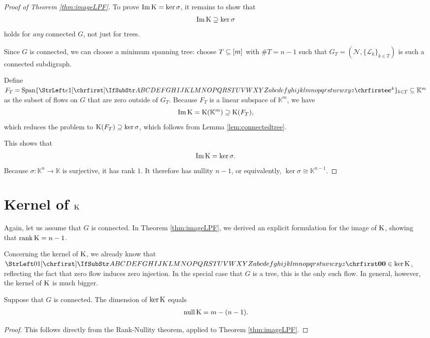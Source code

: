 \documentclass[main.tex]{subfiles}
\begin{document}
\begin{proof}[Proof of Theorem \ref{thm:imageLPF}]
To prove $\operatorname{Im} \text{\textup{K}} = \ker \sigma$, it remains to show that
\begin{gather}
\operatorname{Im} \text{\textup{K}} \supseteq \ker \sigma
\end{gather}
holds for \emph{any} connected $G$, not just for trees.

Since $G$ is connected, we can choose a minimum spanning tree: choose $T \subseteq [m]$ with $\# T = n-1$ such that $G_T=(\mathcal{N}, \{\mathcal{L}_k\}_{k \in T})$ is such a connected subdigraph.

Define $F_T = \linspan \{\mat{e}^k\}_{k \in T} \subseteq \mathbb{K}^m$ as the subset of flows on $G$ that are zero outside of $G_T$. Because $F_T$ is a linear subspace of $\mathbb{K}^m$, we have
$$\operatorname{Im} \text{\textup{K}} = \text{\textup{K}} (\mathbb{K}^m) \supseteq \text{\textup{K}}(F_T),$$
which reduces the problem to $\text{\textup{K}}(F_T) \supseteq \ker \sigma$, which follows from Lemma \ref{lem:connectedtree}.

This shows that
\begin{gather*}
    \operatorname{Im} \text{\textup{K}} = \ker \sigma.
\end{gather*}
Because $\sigma : \mathbb{K}^n \rightarrow \mathbb{K}$ is surjective, it has rank $1$. It therefore has nullity $n-1$, or equivalently, $\ker \sigma \cong \mathbb{K}^{n-1}$.
\end{proof}









\section{Kernel of $\mathbf{\text{\textup{K}}}$}
Again, let us assume that $G$ is connected. In Theorem \ref{thm:imageLPF}, we derived an explicit formulation for the image of $\text{\textup{K}}$, showing that $\operatorname{rank} \text{\textup{K}} = n-1$.

Concerning the kernel of $\text{\textup{K}}$, we already know that $\mat{0} \in \ker \FRT$, reflecting the fact that zero flow induces zero injection. In the special case that $G$ is a tree, this is the only such flow. In general, however, the kernel of $\text{\textup{K}}$ is much bigger.

\begin{proposition}\label{prop:nullityLPF}
Suppose that $G$ is connected. The dimension of $\ker \text{\textup{K}}$ equals
\begin{gather*}
    \operatorname{null} \text{\textup{K}} = m - (n - 1).
\end{gather*}
\end{proposition}
\begin{proof}
This follows directly from the Rank-Nullity theorem, applied to Theorem \ref{thm:imageLPF}.
\end{proof}
\end{document}
